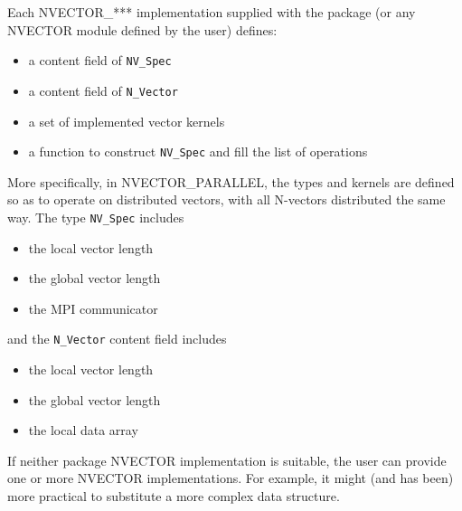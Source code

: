 Each NVECTOR\_*** implementation supplied with the package (or any
NVECTOR module defined by the user) defines:
\begin{itemize}
\item a content field of {\tt NV\_Spec}
\item a content field of {\tt N\_Vector}
\item a set of implemented vector kernels
\item a function to construct {\tt NV\_Spec} and fill the list of operations
\end{itemize}

More specifically, in NVECTOR\_PARALLEL, the types and kernels are
defined so as to operate on distributed vectors, with all N-vectors
distributed the same way.  The type {\tt NV\_Spec} includes
\begin{itemize}
  \item the local vector length
  \item the global vector length
  \item the MPI communicator
\end{itemize}
and the {\tt N\_Vector} content field includes
\begin{itemize}
  \item the local vector length
  \item the global vector length
  \item the local data array
\end{itemize}

If neither package NVECTOR implementation is suitable, the user can provide
one or more NVECTOR implementations.  For example, it might (and has been)
more practical to substitute a more complex data structure.


